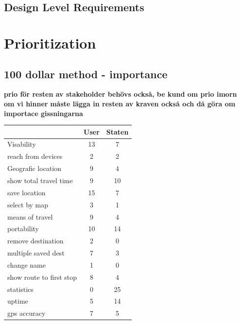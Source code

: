 \documentclass[a4paper]{article}
\begin{document}
		\subsection{Design Level Requirements}	
	\section{Prioritization}
		\subsection{100 dollar method -  importance}
		\textbf{prio för resten av stakeholder behövs också, be kund om prio imorn om vi hinner}
		\textbf{måste lägga in resten av kraven också och då göra om importace gissningarna}
		\begin{tabular}{|l|c|c|}
			\hline
			&User	&Staten \\
			\hline			
			Visability	&13	&7 \\
			\hline
			reach from devices	&2	&2 \\
			\hline
			Geografic location	&9	&4 \\
			\hline
			show total travel time	&9	&10 \\
			\hline
			save location	&15	&7 \\
			\hline
			select by map	&3	&1 \\
			\hline
			means of travel	&9	&4 \\
			\hline
			portability	&10	&14 \\
			\hline
			remove destination	&2	&0 \\
			\hline
			multiple saved dest	&7	&3 \\
			\hline
			change name	&1	&0 \\
			\hline
			show route to first stop	&8	&4 \\
			\hline
			statistics	&0	&25 \\
			\hline
			uptime	&5	&14 \\
			\hline
			gps accuracy	&7	&5 \\
			\hline			
			
		\end{tabular}
\end{document}

